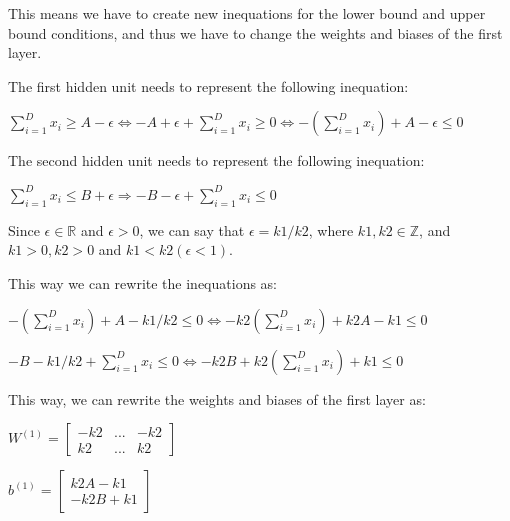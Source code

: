 \documentclass{article}
\begin{document}
This means we have to create new inequations for the lower bound and upper bound conditions, 
and thus we have to change the weights and biases of the first layer.

\bigskip

The first hidden unit needs to represent the following inequation:

\bigskip

$ \sum_{i=1}^{D} x_i \geq A - \epsilon \iff -A + \epsilon + \sum_{i=1}^{D} x_i \geq 0 
\iff -(\sum_{i=1}^{D} x_i) + A - \epsilon \leq 0$

\bigskip

The second hidden unit needs to represent the following inequation:

\bigskip

$ \sum_{i=1}^{D} x_i \leq B + \epsilon \Rightarrow -B - \epsilon + \sum_{i=1}^{D} x_i \leq 0$

\bigskip

Since $\epsilon \in \mathbb{R}$ and $\epsilon > 0$, we can say that $\epsilon = k1/k2$, where $k1, k2 \in \mathbb{Z}$, and $k1 > 0, k2 > 0$ and $k1 < k2
(\epsilon < 1)$.

\bigskip

This way we can rewrite the inequations as:

\bigskip

$ -(\sum_{i=1}^{D} x_i) + A - k1/k2 \leq 0 \iff -k2(\sum_{i=1}^{D} x_i) + k2A - k1 \leq 0$

\bigskip

$ -B - k1/k2 + \sum_{i=1}^{D} x_i \leq 0 \iff -k2B + k2(\sum_{i=1}^{D} x_i) + k1 \leq 0$

\bigskip

This way, we can rewrite the weights and biases of the first layer as:

\bigskip

\( W^{(1)} = \begin{bmatrix}
    -k2 & ...  & -k2\\
    k2 & ... & k2
\end{bmatrix}
\)

\bigskip

\(b^{(1)} = \begin{bmatrix}
    k2A - k1 \\
    -k2B + k1
\end{bmatrix}
\)
\end{document}
